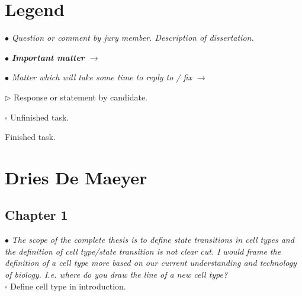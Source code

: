 \documentclass[10pt]{article}
\newcommand{\todo}{$\square$}
\newcommand{\done}{\makebox[0pt][l]{$\square$}\raisebox{.15ex}{\hspace{0.1em}$\checkmark$}}%
\newcommand{\exam}[2][\  ]{\hspace{0pt}\marginpar{\color{myred}#1}$\bullet$ \textit{#2}}
\newcommand{\imp}[1]{\textbf{#1}}
\newcommand{\nimp}[1]{{\color{mygray} #1}}
\newcommand{\answ}[1]{{\color{myblue} $\triangleright$ #1}}
\newcommand{\task}[2][\todo]{{\color{myblue} #1 #2}}
\newcommand{\bigexclaim}{\raisebox{-0.1em}{\BigTriangleUp}\hspace{-0.32em}\llap{\small\textbf{!}}\hspace{0.32em}}
\newcommand{\tagimp}{\bigexclaim}
\newcommand{\tagtime}{{\Large $\hourglass$}}
\begin{document}
%
%
%
%
%
%
%
%		

\section{Legend}
\exam{Question or comment by jury member. \nimp{Description of dissertation.}}

\exam[\tagimp]{\imp{Important matter} $\rightarrow$}

\exam[\tagtime]{Matter which will take some time to reply to / fix $\rightarrow$}

\answ{Response or statement by candidate.}

\task{Unfinished task.}

\task[\done]{Finished task.}

\section{Dries De Maeyer}

\subsection{Chapter 1}

\exam{The scope of the complete thesis is to define state transitions in cell types and the
	definition of cell type/state transition is not clear cut. I would frame the definition of a cell
	type more based on our current understanding and technology of biology. I.e. where do you
	draw the line of a new cell type?} \\
\task{Define cell type in introduction.}
\end{document}
